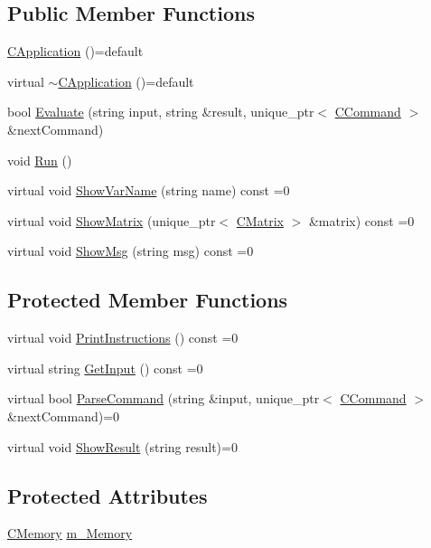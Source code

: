 \subsection*{Public Member Functions}
\begin{DoxyCompactItemize}
\item 
\hyperlink{classCApplication_a186bb7420ce66fadac70d2c30311b6ee}{C\+Application} ()=default
\item 
virtual \hyperlink{classCApplication_ab4448f8a90f380d4ac2afcc9ee59780d}{$\sim$\+C\+Application} ()=default
\item 
bool \hyperlink{classCApplication_a89642c9a6de3ced8f1f77e4fed479e7c}{Evaluate} (string input, string \&result, unique\+\_\+ptr$<$ \hyperlink{classCCommand}{C\+Command} $>$ \&next\+Command)
\item 
void \hyperlink{classCApplication_aa069063a23e53ea9858995f3ca34d6fb}{Run} ()
\item 
virtual void \hyperlink{classCApplication_a5994ba2f7b8a5d88290040616765baaa}{Show\+Var\+Name} (string name) const =0
\item 
virtual void \hyperlink{classCApplication_a8d6b41c059da7fbd01a4857bcb1c06e0}{Show\+Matrix} (unique\+\_\+ptr$<$ \hyperlink{classCMatrix}{C\+Matrix} $>$ \&matrix) const =0
\item 
virtual void \hyperlink{classCApplication_ab88b3a17d0d6e5c14eba88fb263c9857}{Show\+Msg} (string msg) const =0
\end{DoxyCompactItemize}
\subsection*{Protected Member Functions}
\begin{DoxyCompactItemize}
\item 
virtual void \hyperlink{classCApplication_a308f31081c5a2b880c1bc96dbac3260d}{Print\+Instructions} () const =0
\item 
virtual string \hyperlink{classCApplication_a69a1706c3cf78d8dad7e16734e92b3f6}{Get\+Input} () const =0
\item 
virtual bool \hyperlink{classCApplication_ae2fe7afcd1a15cdbf5eb97a69b7731e6}{Parse\+Command} (string \&input, unique\+\_\+ptr$<$ \hyperlink{classCCommand}{C\+Command} $>$ \&next\+Command)=0
\item 
virtual void \hyperlink{classCApplication_a13cc1aa745b5b4c4d7e02a77a1bbdac8}{Show\+Result} (string result)=0
\end{DoxyCompactItemize}
\subsection*{Protected Attributes}
\begin{DoxyCompactItemize}
\item 
\hyperlink{classCMemory}{C\+Memory} \hyperlink{classCApplication_a338eac28666e5f1577716eb7097ffadb}{m\+\_\+\+Memory}
\end{DoxyCompactItemize}



